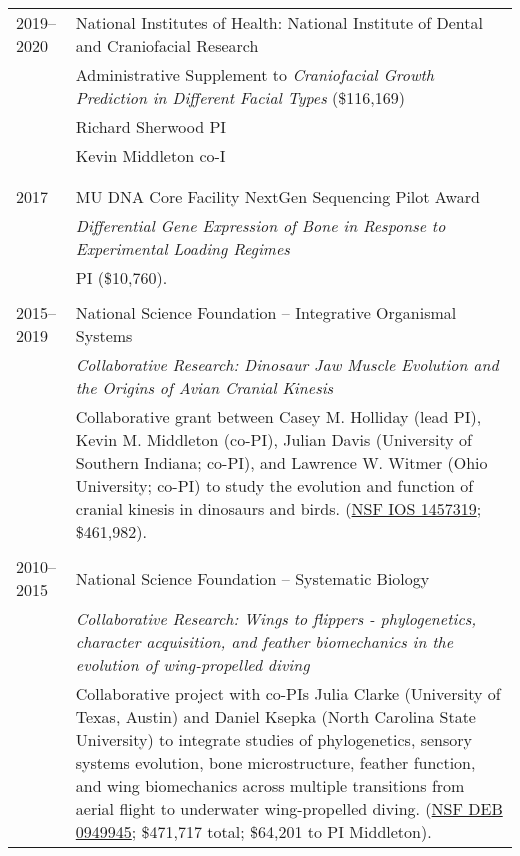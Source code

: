 \begin{longtable}{@{}lX@{}}
    2019--2020 & National Institutes of Health: National Institute of Dental and Craniofacial Research\\
         & Administrative Supplement to \emph{Craniofacial Growth Prediction in Different Facial Types} (\$116,169)\\
         & Richard Sherwood PI\\
         & Kevin Middleton co-I\\[0.5pc]\\
         \\
    2017 & MU DNA Core Facility NextGen Sequencing Pilot Award\\
    & \emph{Differential Gene Expression of Bone in Response to Experimental Loading Regimes}\\
    & PI (\$10,760).\\
    \\
    2015--2019 & National Science Foundation -- Integrative Organismal Systems\\
    & \emph{Collaborative Research: Dinosaur Jaw Muscle Evolution and the Origins of Avian Cranial Kinesis}\\[0.5pc]
    & Collaborative grant between Casey M. Holliday (lead PI), Kevin M. Middleton (co-PI), Julian Davis (University of Southern Indiana; co-PI), and Lawrence W. Witmer (Ohio University; co-PI) to study the evolution and function of cranial kinesis in dinosaurs and birds. (\href{https://www.nsf.gov/awardsearch/showAward?AWD_ID=1457319}{NSF IOS 1457319}; \$461,982).\\
    \\
    2010--2015 & National Science Foundation -- Systematic Biology\\
    & \textit{Collaborative Research: Wings to flippers - phylogenetics, character acquisition, and feather biomechanics in the evolution of wing-propelled diving}\\[0.5pc]
    & Collaborative project with co-PIs Julia Clarke (University of Texas, Austin) and Daniel Ksepka (North Carolina State University) to integrate studies of phylogenetics, sensory systems evolution, bone microstructure, feather function, and wing biomechanics across multiple transitions from aerial flight to underwater wing-propelled diving. (\href{http://www.nsf.gov/awardsearch/showAward.do?AwardNumber=0949945}{NSF DEB 0949945}; \$471,717 total; \$64,201 to PI Middleton).\\

\end{longtable}
